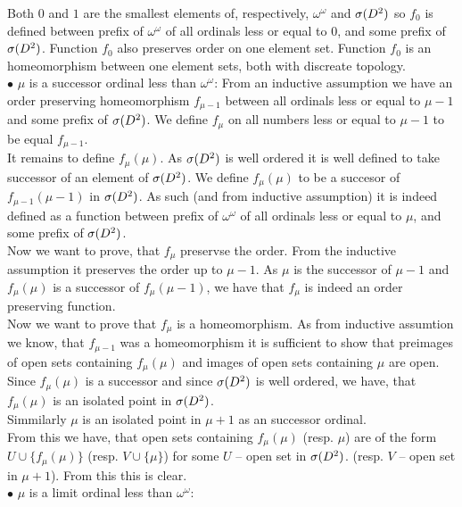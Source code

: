Both $0$ and $1$ are the smallest elements of, respectively, $\omega^\omega$ and ${{\sigma}(D^2)}$ 
so $f_0$ is defined between prefix of $\omega^\omega$ of all ordinals less or equal to $0$, and 
some prefix of ${{\sigma}(D^2)}$. 
Function $f_0$ also preserves order on one element set.
Function $f_0$ is an homeomorphism between one element sets, both with discreate topology. \\
$\bullet$ $\mu$ is a successor ordinal less than $\omega^\omega$: From an inductive assumption 
we have an order preserving homeomorphism $f_{\mu - 1}$ between all ordinals 
less or equal to $\mu - 1$ and some prefix of ${{\sigma}(D^2)}$. 
We define $f_\mu$ on all numbers less or equal to $\mu - 1$ to be equal $f_{\mu-1}$. \\
It remains to define $f_\mu(\mu)$. 
As ${{\sigma}(D^2)}$ is well ordered it is well defined to take successor of an element of ${{\sigma}(D^2)}$. 
We define $f_\mu(\mu)$ to be a succesor of $f_{\mu - 1}(\mu-1)$ in ${{\sigma}(D^2)}$. As such (and from 
inductive assumption) it is indeed defined as a function between prefix of $\omega^\omega$ of all 
ordinals less or equal to $\mu$, and 
some prefix of ${{\sigma}(D^2)}$.
\\
Now we want to prove, that $f_\mu$ preservse the order. From the inductive assumption 
it preserves the order up to $\mu - 1$. As $\mu$ is the successor of $\mu - 1$ and 
$f_\mu(\mu)$ is a successor of $f_\mu(\mu-1)$, we have that $f_\mu$ is indeed an order preserving 
function. \\
Now we want to prove that $f_\mu$ is a homeomorphism. As from inductive assumtion we know, 
that $f_{\mu - 1}$ was a homeomorphism it is sufficient to show that preimages of open 
sets containing $f_\mu(\mu)$ and images of open sets containing $\mu$ are open. \\
Since $f_\mu(\mu)$ is a successor and since ${{\sigma}(D^2)}$ is well ordered, we have, that $f_\mu(\mu)$ 
is an isolated point in ${{\sigma}(D^2)}$. \\
Simmilarly $\mu$ is an isolated point in $\mu + 1$ as an successor ordinal. \\
From this we have, that open sets containing $f_\mu(\mu)$ (resp. $\mu$) are of the form 
$U \cup \{f_\mu(\mu)\}$ (resp. $V \cup \{\mu\}$) for some $U$ -- open set in ${{\sigma}(D^2)}$. 
(resp. $V$ -- open set in $\mu + 1$).
From this this is clear. \\
$\bullet$ $\mu$ is a limit ordinal less than $\omega^\omega$:  
